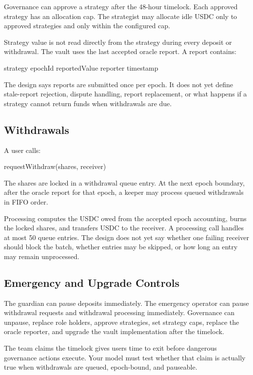 Governance can approve a strategy after the 48-hour timelock. Each approved strategy has an allocation cap. The strategist may allocate idle USDC only to approved strategies and only within the configured cap.

Strategy value is not read directly from the strategy during every deposit or withdrawal. The vault uses the last accepted oracle report. A report contains:

\begin{codeblock}
strategy
epochId
reportedValue
reporter
timestamp
\end{codeblock}

The design says reports are submitted once per epoch. It does not yet define stale-report rejection, dispute handling, report replacement, or what happens if a strategy cannot return funds when withdrawals are due.

\subsection*{Withdrawals}

A user calls:

\begin{codeblock}
requestWithdraw(shares, receiver)
\end{codeblock}

The shares are locked in a withdrawal queue entry. At the next epoch boundary, after the oracle report for that epoch, a keeper may process queued withdrawals in FIFO order.

Processing computes the USDC owed from the accepted epoch accounting, burns the locked shares, and transfers USDC to the receiver. A processing call handles at most 50 queue entries. The design does not yet say whether one failing receiver should block the batch, whether entries may be skipped, or how long an entry may remain unprocessed.

\subsection*{Emergency and Upgrade Controls}

The guardian can pause deposits immediately. The emergency operator can pause withdrawal requests and withdrawal processing immediately. Governance can unpause, replace role holders, approve strategies, set strategy caps, replace the oracle reporter, and upgrade the vault implementation after the timelock.

The team claims the timelock gives users time to exit before dangerous governance actions execute. Your model must test whether that claim is actually true when withdrawals are queued, epoch-bound, and pauseable.

